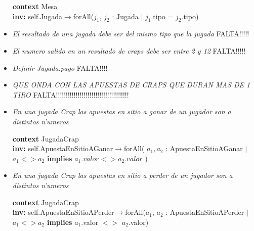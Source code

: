\begin{itemize}
\textbf{context}  Mesa \\ \textbf{inv:} 
  self.Jugada$\rightarrow$forAll($j_{1}$, $j_{2}$ : Jugada $|$ $j_{1}$.tipo = $j_{2}$.tipo)

  
\item\textit{El resultado de una jugada debe ser del mismo tipo que la jugada}
FALTA!!!!!


\item\textit{El numero salido en un resultado de craps debe ser entre 2 y 12}
FALTA!!!!!


\item\textit{Definir Jugada.pago}
FALTA!!!!


\item\textit{QUE ONDA CON LAS APUESTAS DE CRAPS QUE DURAN MAS DE 1 TIRO}
FALTA!!!!!!!!!!!!!!!!!!!!!!!!!!!!!!!!!!!!!


\item\textit{ En una jugada Crap las apuestas en sitio a ganar de un jugador son a distintos n'umeros}

\textbf{context}  JugadaCrap \\ \textbf{inv:} 
  self.ApuestaEnSitioAGanar$\rightarrow$forAll( $a_{1}, a_{2}$ : ApuestaEnSitioAGanar $ | $ $ a_{1} <> a_{2} $  \textbf{implies} $ a_{1}.valor <> a_{2}.valor $ )


\item\textit{ En una jugada Crap las apuestas en sitio a perder de un jugador son a distintos n'umeros}

\textbf{context}  JugadaCrap \\ \textbf{inv:} 
  self.ApuestaEnSitioAPerder$\rightarrow$forAll($a_{1}$, $a_{2}$ : ApuestaEnSitioAPerder  $ | $ $a_{1} <> a_{2} $ \textbf{implies} $a_{1}$.valor $<>$ $a_{2}$.valor)

\end{itemize}
